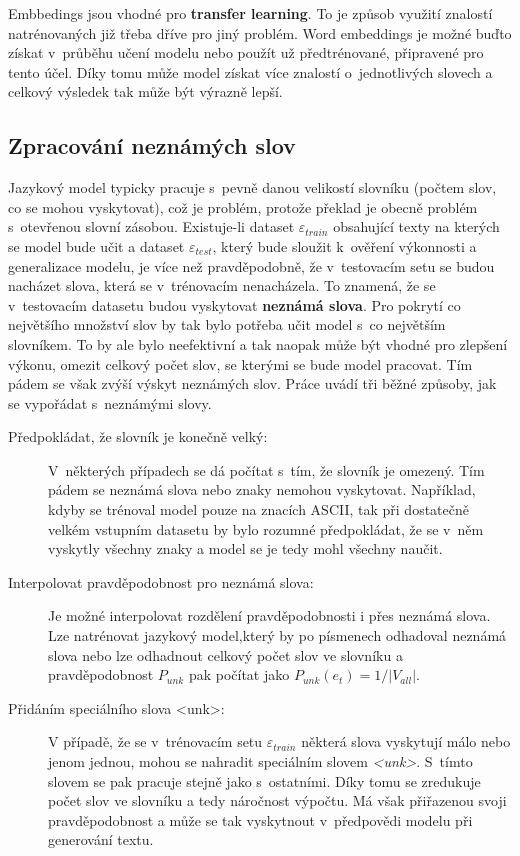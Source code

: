 Embbedings jsou vhodné pro \textbf{transfer learning}. To je způsob využití znalostí natrénovaných již třeba dříve pro jiný problém. Word embeddings je možné buďto získat v~průběhu učení modelu nebo použít už předtrénované, připravené pro tento účel. Díky tomu může model získat více znalostí o~jednotlivých slovech a celkový výsledek tak může být výrazně lepší.

\subsection{Zpracování neznámých slov} \label{subsection:oov}
Jazykový model typicky pracuje s~pevně danou velikostí slovníku (počtem slov, co se mohou vyskytovat), což je problém, protože překlad je obecně problém s~otevřenou slovní zásobou. Existuje-li dataset $\varepsilon_{train}$ obsahující texty na kterých se model bude učit a dataset $\varepsilon_{test}$, který bude sloužit k~ověření výkonnosti a generalizace modelu, je více než pravděpodobně, že v~testovacím setu se budou nacházet slova, která se v~trénovacím nenacházela. To znamená, že se v~testovacím datasetu budou vyskytovat \textbf{neznámá slova}. Pro pokrytí co největšího množství slov by tak bylo potřeba učit model s~co největším slovníkem. To by ale bylo neefektivní a tak naopak může být vhodné pro zlepšení výkonu, omezit celkový počet slov, se kterými se bude model pracovat. Tím pádem se však zvýší výskyt neznámých slov. Práce \cite{nmtTutorial} uvádí tři běžné způsoby, jak se vypořádat s~neznámými slovy.

\begin{description}
  \item[Předpokládat, že slovník je konečně velký:] V~některých případech se dá počítat s~tím, že slovník je omezený. Tím pádem se neznámá slova nebo znaky nemohou vyskytovat. Například, kdyby se trénoval model pouze na znacích ASCII, tak při dostatečně velkém vstupním datasetu by bylo rozumné předpokládat, že se v~něm vyskytly všechny znaky a model se je tedy mohl všechny naučit.
  \item[Interpolovat pravděpodobnost pro neznámá slova:] Je možné interpolovat rozdělení pravděpodobnosti i přes neznámá slova. Lze natrénovat jazykový model,který by po písmenech odhadoval neznámá slova nebo lze odhadnout celkový počet slov ve slovníku a pravděpodobnost $P_{unk}$ pak počítat jako $P_{unk}(e_t) = 1/|V_{all}|$.
  \item[Přidáním speciálního slova <unk>:]\label{description:unk}V případě, že se v~trénovacím setu $\varepsilon_{train}$ některá slova vyskytují málo nebo jenom jednou, mohou se nahradit speciálním slovem \emph{<unk>}. S~tímto slovem se pak pracuje stejně jako s~ostatními. Díky tomu se zredukuje počet slov ve slovníku a tedy náročnost výpočtu. Má však přiřazenou svoji pravděpodobnost a může se tak vyskytnout v~předpovědi modelu při generování textu.
\end{description}

